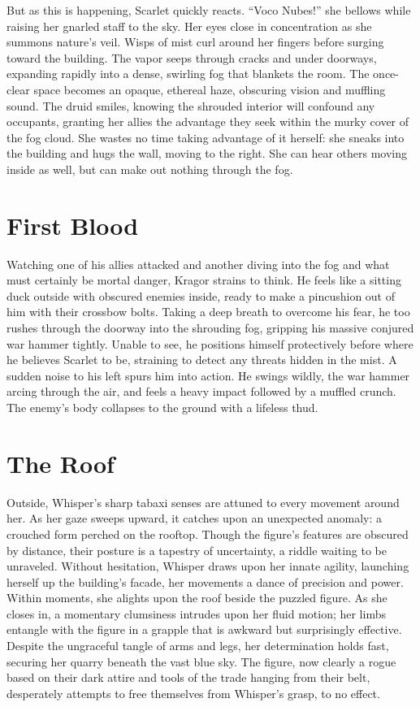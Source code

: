 \documentclass[
  letterpaper,12pt,twoside,twocolumn,openany,
  nodeprecatedcode,bg=full]{dndbook}
\begin{document}
But as this is happening, Scarlet quickly reacts. ``Voco Nubes!'' she
bellows while raising her gnarled staff to the sky. Her eyes close in
concentration as she summons nature's veil. Wisps of mist curl around
her fingers before surging toward the building. The vapor seeps through
cracks and under doorways, expanding rapidly into a dense, swirling fog
that blankets the room. The once-clear space becomes an opaque, ethereal
haze, obscuring vision and muffling sound. The druid smiles, knowing the
shrouded interior will confound any occupants, granting her allies the
advantage they seek within the murky cover of the fog cloud. She wastes
no time taking advantage of it herself: she sneaks into the building and
hugs the wall, moving to the right. She can hear others moving inside as
well, but can make out nothing through the fog.

\section{First Blood}\label{first-blood}

Watching one of his allies attacked and another diving into the fog and
what must certainly be mortal danger, Kragor strains to think. He feels
like a sitting duck outside with obscured enemies inside, ready to make
a pincushion out of him with their crossbow bolts. Taking a deep breath
to overcome his fear, he too rushes through the doorway into the
shrouding fog, gripping his massive conjured war hammer tightly. Unable
to see, he positions himself protectively before where he believes
Scarlet to be, straining to detect any threats hidden in the mist. A
sudden noise to his left spurs him into action. He swings wildly, the
war hammer arcing through the air, and feels a heavy impact followed by
a muffled crunch. The enemy's body collapses to the ground with a
lifeless thud.

\section{The Roof}\label{the-roof}

Outside, Whisper's sharp tabaxi senses are attuned to every movement
around her. As her gaze sweeps upward, it catches upon an unexpected
anomaly: a crouched form perched on the rooftop. Though the figure's
features are obscured by distance, their posture is a tapestry of
uncertainty, a riddle waiting to be unraveled. Without hesitation,
Whisper draws upon her innate agility, launching herself up the
building's facade, her movements a dance of precision and power. Within
moments, she alights upon the roof beside the puzzled figure. As she
closes in, a momentary clumsiness intrudes upon her fluid motion; her
limbs entangle with the figure in a grapple that is awkward but
surprisingly effective. Despite the ungraceful tangle of arms and legs,
her determination holds fast, securing her quarry beneath the vast blue
sky. The figure, now clearly a rogue based on their dark attire and
tools of the trade hanging from their belt, desperately attempts to free
themselves from Whisper's grasp, to no effect.
\end{document}

